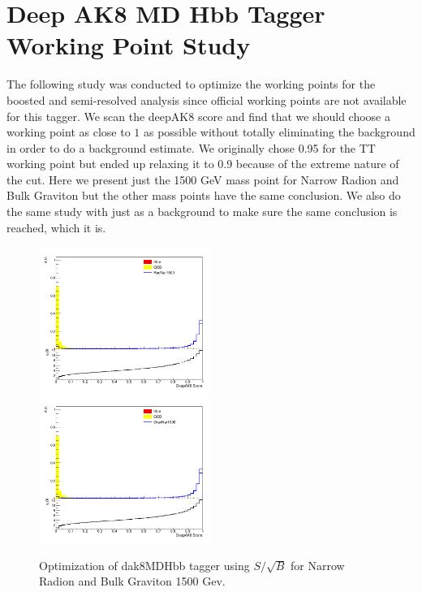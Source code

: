 \section{Deep AK8 MD Hbb Tagger Working Point Study}
The following study was conducted to optimize the working points for the boosted and semi-resolved analysis since official working points are not available for this tagger. We scan the deepAK8 score and find that we should choose a working point as close to $1$ as possible without totally eliminating the background in order to do a background estimate. 
We originally chose 0.95 for the TT working point but ended up relaxing it to 0.9 because of the extreme nature of the cut. Here we present just the 1500 GeV mass point for Narrow Radion and Bulk Graviton but the other mass points have the same conclusion. We also do the same study with just \ttbar as a background to make sure the same conclusion is reached, which it is.
\begin{figure}[!htb]
	\centering
	\includegraphics[width=0.5\textwidth]{Figures/wp_RadNar1500.png}
	\includegraphics[width=0.5\textwidth]{Figures/wp_GravNar1500.png}
	\caption{Optimization of dak8MDHbb tagger using $S/\sqrt{B}$ for Narrow Radion and Bulk Graviton 1500 Gev.}
	\label{fig:SoversqrtBstudy}
\end{figure}
